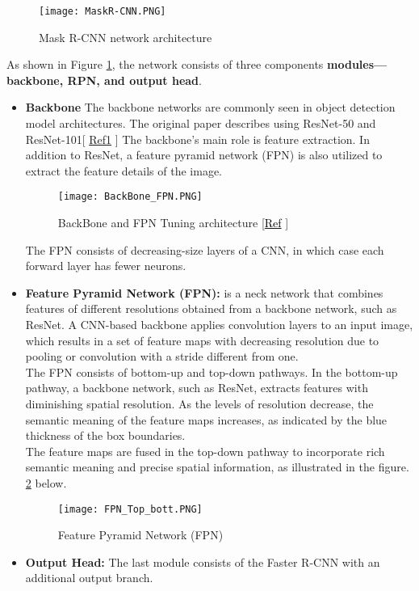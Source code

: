 \begin{figure}[H]
    \centering
    \texttt{[image: MaskR-CNN.PNG]}
    \caption{Mask R-CNN network architecture \cite{he2017mask}}
    \label{fig:MaskR-CNN}
\end{figure}
As shown in Figure \ref{fig:MaskR-CNN}, the network consists of three components \textbf{modules—backbone, RPN, and output head}.
\begin{itemize}
    \item \textbf{Backbone} The backbone networks are commonly seen in object detection model architectures. The original paper describes using ResNet-50 and ResNet-101[ \textcolor{red}{\href{https://arxiv.org/pdf/1612.03144.pdf}{Ref1}} ]
    The backbone’s main role is feature extraction.
    In addition to ResNet, a feature pyramid network (FPN) is also utilized to extract the feature details of the image.
    \begin{figure}[H]
        \centering\texttt{[image: BackBone\_FPN.PNG]}
        \caption{BackBone and FPN Tuning architecture \protect\href{https://medium.com/@freshtechyy/fusing-backbone-features-using-feature-pyramid-network-fpn-c652aa6a264b}{[\textcolor{black}{Ref}} ]}\cite{zhu2022improved} 
    \end{figure}
The FPN consists of decreasing-size layers of a CNN, in which case each forward layer has fewer neurons.

        \item \textbf{Feature Pyramid Network (FPN): } is a neck network that combines features of different resolutions obtained from a backbone network, such as ResNet. A CNN-based backbone applies convolution layers to an input image, which results in a set of feature maps with decreasing resolution due to pooling or convolution with a stride different from one. \\
        The FPN consists of bottom-up and top-down pathways. In the bottom-up pathway, a backbone network, such as ResNet, extracts features with diminishing spatial resolution.
        As the levels of resolution decrease, the semantic meaning of the feature maps increases, as indicated by the blue thickness of the box boundaries. \\
        The feature maps are fused in the top-down pathway to incorporate rich semantic meaning and precise spatial information, as illustrated in the figure. \ref{fig:FPN_Arch} below. \cite{lin2017feature}
        \begin{figure}[H]
            \centering
            \texttt{[image: FPN\_Top\_bott.PNG]}
            \caption{Feature Pyramid Network (FPN) \cite{lin2017feature}}
            \label{fig:FPN_Arch}
        \end{figure}
         \item \textbf{Output Head: } The last module consists of the Faster R-CNN with an additional output branch. \cite{he2017mask}
\end{itemize}
   
